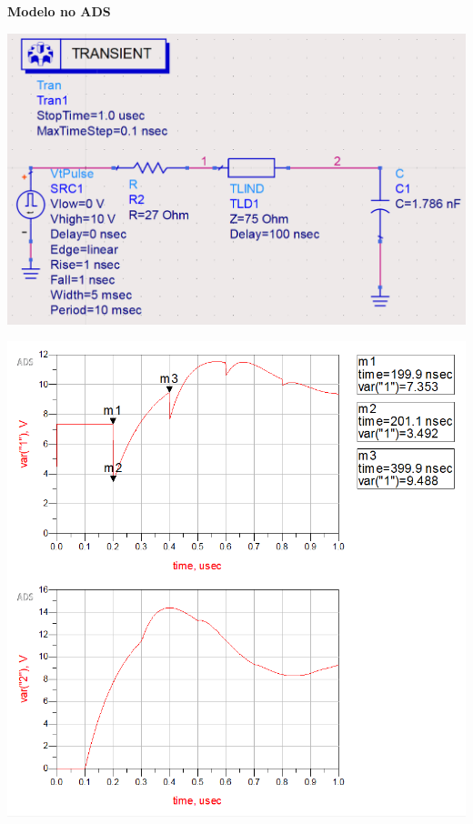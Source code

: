 \documentclass[12pt,a4paper]{article}
\begin{document}
\begin{center}
    \small{\textbf{Modelo no ADS}}\\

\hspace{-1.5cm}
    \begin{minipage}{0.65\textwidth}
        \includegraphics[scale=0.3]{ads1.png}\\
    \end{minipage}
    \begin{minipage}{0.35\textwidth}
        \includegraphics[scale=0.3]{ads2.png}\\
    \end{minipage}


\end{center}
\end{document}
